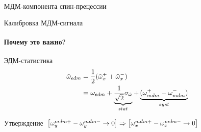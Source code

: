 \documentclass[14pt]{beamer}
\begin{document}
\begin{frame}{МДМ-компонента спин-прецессии}
	\centering
\end{frame}
\begin{frame}{Калибровка МДМ-сигнала}
	\framesubtitle{Почему это важно?}
	\begin{block}{ЭДМ-статистика}
		\begin{align*}
		\hat{\omega}_{edm} &= \frac12(\hat{\omega}_x^+ + \hat{\omega}_x^-) \\
		&= \omega_{edm} + \underbrace{\frac{1}{\sqrt2}\sigma_{\hat{\omega}}}_{stat} + \underbrace{(\omega_{mdm}^+ - \omega_{mdm}^-)}_{syst}
		\end{align*}
	\end{block}
	\begin{block}{Утверждение}
		$\left[\omega_y^{mdm+} - \omega_y^{mdm-} \to 0\right] \Rightarrow \left[\omega_x^{mdm+} - \omega_x^{mdm-} \to 0\right]$
	\end{block}
\end{frame}
\end{document}
